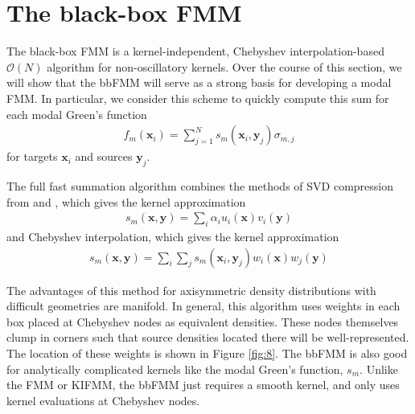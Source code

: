 \documentclass[11pt, oneside]{article}   	%
\begin{document}
\section{The black-box FMM}
The black-box FMM is a kernel-independent, Chebyshev interpolation-based $\mathcal{O}(N)$ algorithm for non-oscillatory kernels. Over the course of this section, we will show that the bbFMM will serve as a strong basis for developing a modal FMM. In particular, we consider this scheme to quickly compute this sum for each modal Green's function
\begin{align}
f_m(\mathbf{x}_i)=\sum_{j=1}^N s_m(\mathbf{x}_i,\mathbf{y}_j)\sigma_{m,j}
\end{align}
for targets $\mathbf{x}_i$ and sources $\mathbf{y}_j$.

The full fast summation algorithm combines the methods of SVD compression from \cite{ZGR} and \cite{MR}, which gives the kernel approximation
\begin{align}
s_m(\mathbf{x},\mathbf{y})=\sum_i \alpha_i u_i(\mathbf{x})v_i(\mathbf{y})
\end{align}
and Chebyshev interpolation, which gives the kernel approximation
\begin{align}
s_m(\mathbf{x},\mathbf{y})=\sum_i\sum_j s_m(\mathbf{x}_i,\mathbf{y}_j)w_i(\mathbf{x})w_j(\mathbf{y})
\end{align}

The advantages of this method for axisymmetric density distributions with difficult geometries are manifold. In general, this algorithm uses weights in each box placed at Chebyshev nodes as equivalent densities. These nodes themselves clump in corners such that source densities located there will be well-represented. The location of these weights is shown in Figure \ref{fig:8}. The bbFMM is also good for analytically complicated kernels like the modal Green's function, $s_m$. Unlike the FMM or KIFMM, the bbFMM just requires a smooth kernel, and only uses kernel evaluations at Chebyshev nodes.
\end{document}
